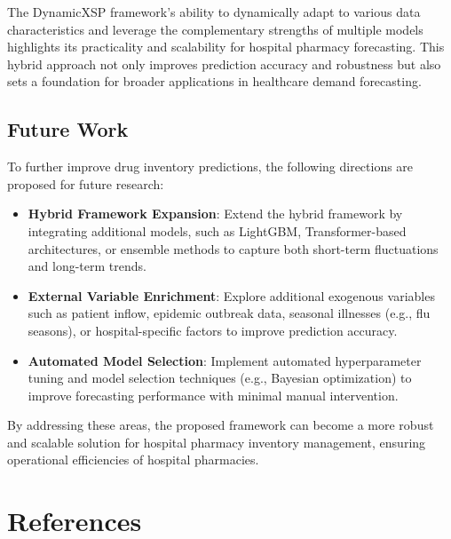 \documentclass[journal]{IEEEtran}
\begin{document}
The DynamicXSP framework's ability to dynamically adapt to various data characteristics and leverage the complementary strengths of multiple models highlights its practicality and scalability for hospital pharmacy forecasting. This hybrid approach not only improves prediction accuracy and robustness but also sets a foundation for broader applications in healthcare demand forecasting.

\subsection{Future Work}
To further improve drug inventory predictions, the following directions are proposed for future research:

\begin{itemize}
    \item \textbf{Hybrid Framework Expansion}: Extend the hybrid framework by integrating additional models, such as LightGBM, Transformer-based architectures, or ensemble methods to capture both short-term fluctuations and long-term trends.
    \item \textbf{External Variable Enrichment}: Explore additional exogenous variables such as patient inflow, epidemic outbreak data, seasonal illnesses (e.g., flu seasons), or hospital-specific factors to improve prediction accuracy.
    \item \textbf{Automated Model Selection}: Implement automated hyperparameter tuning and model selection techniques (e.g., Bayesian optimization) to improve forecasting performance with minimal manual intervention.
\end{itemize}

By addressing these areas, the proposed framework can become a more robust and scalable solution for hospital pharmacy inventory management, ensuring operational efficiencies of hospital pharmacies.

\section{References}
\end{document}
